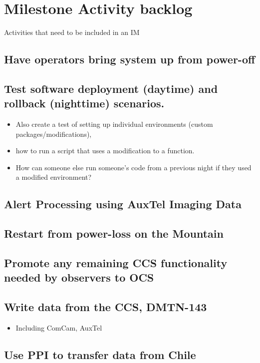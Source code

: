\section{Milestone Activity backlog}

Activities that need to be included in an IM

\subsection{Have operators bring system up from power-off}

\subsection{Test software deployment (daytime) and rollback (nighttime) scenarios.}

\begin{itemize}
\item Also create a test of setting up individual environments (custom packages/modifications),
\item how to run a script that uses a modification to a function.
\item How can someone else run someone's code from a previous night if they used a modified environment?
\end{itemize}

\subsection{Alert Processing using AuxTel Imaging Data}

\subsection{Restart from power-loss on the Mountain}

\subsection{Promote any remaining CCS functionality needed by observers to OCS}

\subsection{Write data from the CCS, DMTN-143}

\begin{itemize}
\item Including ComCam, AuxTel
\end{itemize}

\subsection{Use PPI to transfer data from Chile}
